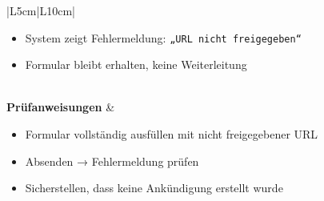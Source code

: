 \documentclass[a4paper,12pt]{article}
\begin{document}
\begin{longtable}{|L{5cm}|L{10cm}|}
\begin{minipage}[t]{\linewidth}
\vspace{0.5em}
\begin{itemize}[leftmargin=*]
  \item System zeigt Fehlermeldung: \texttt{„URL nicht freigegeben“}
  \item Formular bleibt erhalten, keine Weiterleitung
\end{itemize}
\vspace{0.5em}
\end{minipage} \\
\hline
\textbf{Prüfanweisungen} &
\begin{minipage}[t]{\linewidth}
\vspace{0.5em}
\begin{itemize}[leftmargin=*]
  \item Formular vollständig ausfüllen mit nicht freigegebener URL
  \item Absenden → Fehlermeldung prüfen
  \item Sicherstellen, dass keine Ankündigung erstellt wurde
\end{itemize}
\vspace{0.5em}
\end{minipage} \\
\hline
\end{longtable}

\vspace{1cm}
\end{document}
